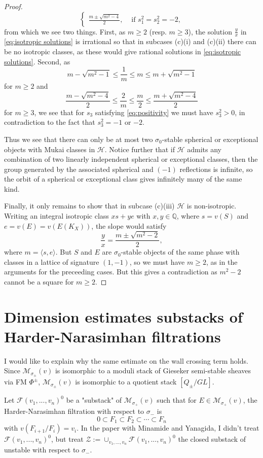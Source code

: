 \documentclass[leqno,11pt]{amsart}
\def\Q{\ensuremath{\mathbb{Q}}}
\theoremstyle{definition}
\def\Q{\ensuremath{\mathbb{Q}}}
\def\HH{\ensuremath{\mathcal H}}
\def\cal{\mathcal}
\begin{document}
\begin{proof}
\begin{equation}
\begin{cases}
\frac{m\pm\sqrt{m^2-4}}{2}, & \text{ if }s_1^2=s_2^2=-2,
\end{cases}\end{equation} from which we see two things.  First, as $m\geq 2$ (resp. $m\geq 3$), the solution $\frac{y}{x}$ in \eqref{eq:isotropic solutions} is irrational so that in subcases (c)(i) and (c)(ii) there can be no isotropic classes, as these would give rational solutions in \eqref{eq:isotropic solutions}.  Second, as $$m-\sqrt{m^2-1}\leq\frac{1}{m}\leq m\leq m+\sqrt{m^2-1}$$ for $m\geq 2$ and $$\frac{m-\sqrt{m^2-4}}{2}\leq\frac{2}{m}\leq\frac{m}{2}\leq\frac{m+\sqrt{m^2-4}}{2}$$ for $m\geq 3$, we see that for $s_3$ satisfying \eqref{eq:positivity} we must have $s_3^2>0$, in contradiction to the fact that $s_3^2=-1$ or $-2$.  

Thus we see that there can only be at most two $\sigma_0$-stable spherical or exceptional objects with Mukai classes in $\HH$.  Notice further that if $\HH$ admits any combination of two linearly independent spherical or exceptional classes, then the group generated by the associated spherical and $(-1)$ reflections is infinite, so the orbit of a spherical or exceptional class gives infinitely many of the same kind. 

Finally, it only remains to show that in subcase (c)(iii) $\HH$ is non-isotropic.  Writing an integral isotropic class $xs+ye$ with $x,y\in\Q$, where $s=v(S)$ and $e=v(E)=v(E(K_X))$, the slope would satisfy $$\frac{y}{x}=\frac{m\pm\sqrt{m^2-2}}{2},$$ where $m=\langle s,e\rangle$.  But $S$ and $E$ are $\sigma_0$-stable objects of the same phase with classes in a lattice of signature $(1,-1)$, so we must have $m\geq 2$, as in the arguments for the preceeding cases.  But this gives a contradiction as $m^2-2$ cannot be a square for $m\geq 2$.
\end{proof}

\section{Dimension estimates substacks of Harder-Narasimhan filtrations}

I would like to explain why the same estimate on the wall crossing term
holds.
Since ${\cal M}_{\sigma_\pm}(v)$ is isomorphic to a moduli stack of
Gieseker semi-stable sheaves via FM $\Phi^\pm$, 
${\cal M}_{\sigma_\pm}(v)$
is isomorphic to a quotient stack
$[Q_\pm/GL]$. 

Let ${\cal F}(v_1,...,v_n)^0$ be a "substack" of ${\cal M}_{\sigma_+}(v)$
such that for $E \in {\cal M}_{\sigma_+}(v)$,
the Harder-Narasimhan filtration with respect to $\sigma_-$ is
$$
0 \subset F_1 \subset F_2 \subset \cdots \subset F_n
$$
with $v(F_{i+1}/F_i)=v_i$.
In the paper with Minamide and Yanagida, I didn't treat 
${\cal F}(v_1,...,v_n)^0$, but treat ${\cal Z}:=\cup_{v_1,...,v_n}{\cal F}(v_1,...,v_n)^0$
the closed substack of unstable with respect to $\sigma_-$.
\end{document}

